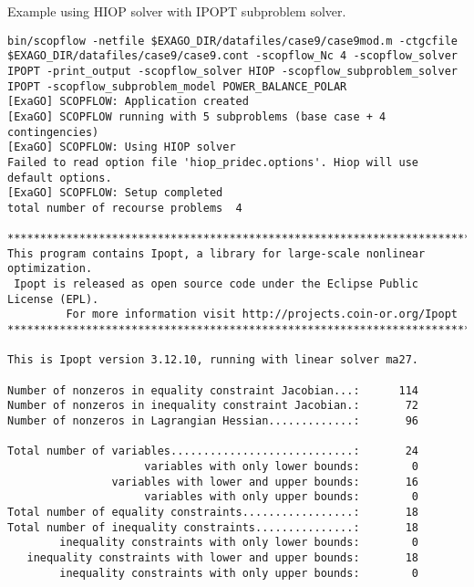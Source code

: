 Example using HIOP solver with IPOPT subproblem solver.
\begin{lstlisting}
bin/scopflow -netfile $EXAGO_DIR/datafiles/case9/case9mod.m -ctgcfile $EXAGO_DIR/datafiles/case9/case9.cont -scopflow_Nc 4 -scopflow_solver IPOPT -print_output -scopflow_solver HIOP -scopflow_subproblem_solver IPOPT -scopflow_subproblem_model POWER_BALANCE_POLAR
[ExaGO] SCOPFLOW: Application created
[ExaGO] SCOPFLOW running with 5 subproblems (base case + 4 contingencies)
[ExaGO] SCOPFLOW: Using HIOP solver
Failed to read option file 'hiop_pridec.options'. Hiop will use default options.
[ExaGO] SCOPFLOW: Setup completed
total number of recourse problems  4

******************************************************************************
This program contains Ipopt, a library for large-scale nonlinear optimization.
 Ipopt is released as open source code under the Eclipse Public License (EPL).
         For more information visit http://projects.coin-or.org/Ipopt
******************************************************************************

This is Ipopt version 3.12.10, running with linear solver ma27.

Number of nonzeros in equality constraint Jacobian...:      114
Number of nonzeros in inequality constraint Jacobian.:       72
Number of nonzeros in Lagrangian Hessian.............:       96

Total number of variables............................:       24
                     variables with only lower bounds:        0
                variables with lower and upper bounds:       16
                     variables with only upper bounds:        0
Total number of equality constraints.................:       18
Total number of inequality constraints...............:       18
        inequality constraints with only lower bounds:        0
   inequality constraints with lower and upper bounds:       18
        inequality constraints with only upper bounds:        0


\end{lstlisting}
